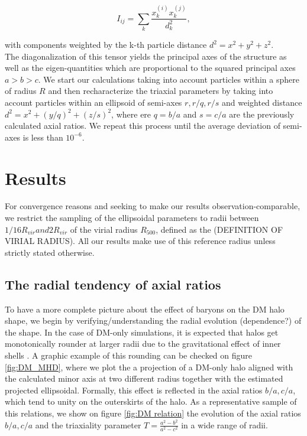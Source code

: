 \documentclass[a4paper,fleqn,usenatbib]{mnras}
\begin{document}
\begin{equation}
I_{ij} = \sum_k \frac{x_k^{(i)}x_k^{(j)}}{d^2_k},
\label{eq:inertia}
\end{equation}

with components weighted by the k-th particle distance $d^2=x^2+y^2+z^2$.\\

The diagonalization of this tensor yields the principal axes of the structure as well as the eigen-quantities which are proportional to the squared principal axes $a>b>c$. We start our calculations taking into account particles within a sphere of radius $R$ and then recharacterize the triaxial parameters by taking into account particles within an ellipsoid of semi-axes $r,r/q,r/s$ and weighted distance $d^2=x^2+(y/q)^2+(z/s)^2$, where ere $q = b/a$ and $s=c/a$ are the previously calculated axial ratios. We repeat this process until the average deviation of semi-axes is less than $10^{-6}$.\\

\section{Results}
For convergence reasons and seeking to make our results observation-comparable, we restrict the sampling of the ellipsoidal parameters to radii between $1/16 R_{vir} and 2R_{vir}$ of the virial radius $R_{500}$, defined as the (DEFINITION OF VIRIAL RADIUS). All our results make use of this reference radius unless strictly stated otherwise.\\ 

\subsection{The radial tendency of axial ratios}
To have a more complete picture about the effect of baryons on the DM halo shape, we begin by verifying/understanding the radial evolution (dependence?) of the shape. In the case of DM-only simulations, it is expected that halos get monotonically rounder at larger radii due to the gravitational effect of inner shells \citep{Vera-Ciro et al. 2012}. A graphic example of this rounding can be checked on figure \ref{fig:DM_MHD}, where we plot the a projection of a DM-only halo aligned with the calculated minor axis at two different radius together with the estimated projected ellipsoidal. Formally, this effect is reflected in the axial ratios $b/a,c/a$, which tend to unity on the outerskirts of the halo. As a representative sample of this relations, we show on figure \ref{fig:DM relation} the evolution of the axial ratios $b/a,c/a$ and the triaxiality parameter $T=\frac{a^2-b^2}{a^2-c^2}$ in a wide range of radii.\\
\end{document}
